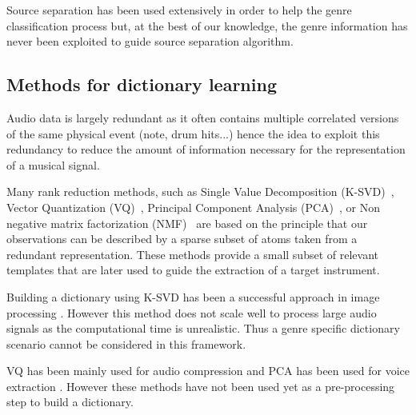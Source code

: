 \documentclass{article}
\begin{document}
Source separation has been used extensively in order to help the genre classification process \cite{rump2010autoregressive,lampropoulos2005musical} but, at the best of our knowledge, the genre information has never been exploited to guide source separation algorithm. 


\subsection{Methods for dictionary learning}


Audio data is largely redundant as it often contains multiple correlated versions of the same physical event (note, drum hits...) \cite{tovsic2011dictionary} hence the idea to exploit this redundancy to reduce the amount of information necessary for the representation of a musical signal. 

Many rank reduction methods, such as Single Value Decomposition (K-SVD)~\cite{aharon2006img}, Vector Quantization (VQ)~\cite{gersho2012vector}, Principal Component Analysis (PCA)~\cite{huang2012singing}, or Non negative matrix factorization (NMF)~\cite{Smaragdis03} are based on the principle that our observations can be described by a sparse subset of atoms taken from a redundant representation. These methods provide a small subset of relevant templates that are later used to guide the extraction of a target instrument. 

Building a dictionary using K-SVD has been a successful approach in image processing \cite{zhang2010discriminative}. However this method does not scale well to process large audio signals as the computational time is unrealistic. Thus a genre specific dictionary scenario cannot be considered in this framework.

VQ has been mainly used for audio compression \cite{gersho2012vector} and PCA has been used for voice extraction \cite{huang2012singing}. However these methods have not been used yet as a pre-processing step to build a dictionary. 
\end{document}
